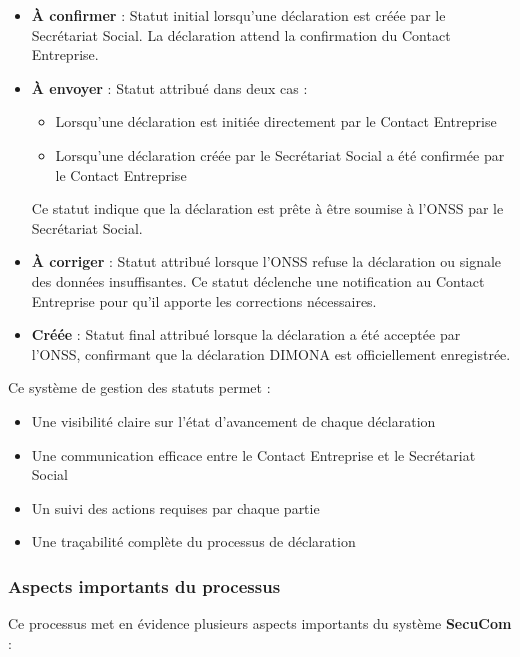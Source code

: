 \begin{itemize}[leftmargin=*,label=\textcolor{darkgray}{$\bullet$},itemsep=0.3em]
  \item \textbf{À confirmer} : Statut initial lorsqu'une déclaration est créée par le Secrétariat Social. La déclaration attend la confirmation du Contact Entreprise.
  
  \item \textbf{À envoyer} : Statut attribué dans deux cas :
    \begin{itemize}
      \item Lorsqu'une déclaration est initiée directement par le Contact Entreprise
      \item Lorsqu'une déclaration créée par le Secrétariat Social a été confirmée par le Contact Entreprise
    \end{itemize}
    Ce statut indique que la déclaration est prête à être soumise à l'ONSS par le Secrétariat Social.
  
  \item \textbf{À corriger} : Statut attribué lorsque l'ONSS refuse la déclaration ou signale des données insuffisantes. Ce statut déclenche une notification au Contact Entreprise pour qu'il apporte les corrections nécessaires.
  
  \item \textbf{Créée} : Statut final attribué lorsque la déclaration a été acceptée par l'ONSS, confirmant que la déclaration DIMONA est officiellement enregistrée.
\end{itemize}

\noindent Ce système de gestion des statuts permet :
\begin{itemize}[leftmargin=*,label=\textcolor{darkgray}{$\bullet$},itemsep=0.3em]
  \item Une visibilité claire sur l'état d'avancement de chaque déclaration
  \item Une communication efficace entre le Contact Entreprise et le Secrétariat Social
  \item Un suivi des actions requises par chaque partie
  \item Une traçabilité complète du processus de déclaration
\end{itemize}

\newpage
\subsubsection{Aspects importants du processus}

\noindent Ce processus met en évidence plusieurs aspects importants du système \textbf{SecuCom} :

